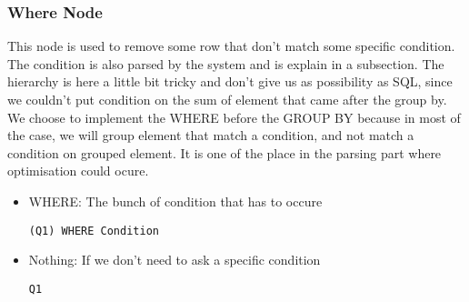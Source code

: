 \documentclass{article}
\begin{document}
\subsubsection{Where Node}
This node is used to remove some row that don't match some specific condition. The condition is also parsed by the system and is explain in a subsection. The hierarchy is here a little bit tricky and don't give us as possibility as SQL, since we couldn't put condition on the sum of element that came after the group by. We choose to implement the WHERE before the GROUP BY because in most of the case, we will group element that match a condition, and not match a condition on grouped element.
It is one of the place in the parsing part where optimisation could ocure.
\begin{itemize}
\item WHERE: The bunch of condition that has to occure
\begin{verbatim}
(Q1) WHERE Condition
\end{verbatim}
\item Nothing:  If we don't need to ask a specific condition
\begin{verbatim}
Q1
\end{verbatim}
\end{itemize}
\end{document}
